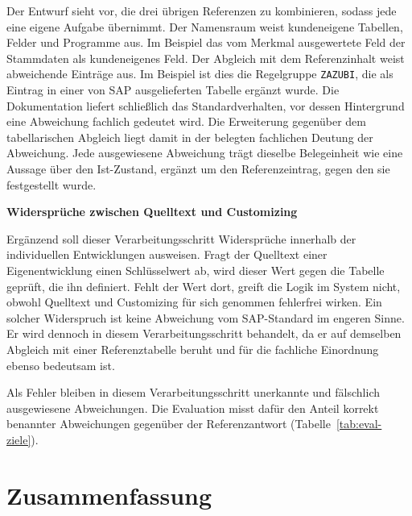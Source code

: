 Der Entwurf sieht vor, die drei übrigen Referenzen zu kombinieren, sodass jede eine eigene Aufgabe übernimmt. Der Namensraum weist kundeneigene Tabellen, Felder und Programme aus. Im Beispiel das vom Merkmal ausgewertete Feld der Stammdaten als kundeneigenes Feld. Der Abgleich mit dem Referenzinhalt weist abweichende Einträge aus. Im Beispiel ist dies die Regelgruppe \texttt{ZAZUBI}, die als Eintrag in einer von SAP ausgelieferten Tabelle ergänzt wurde. Die Dokumentation liefert schließlich das Standardverhalten, vor dessen Hintergrund eine Abweichung fachlich gedeutet wird. Die Erweiterung gegenüber dem tabellarischen Abgleich liegt damit in der belegten fachlichen Deutung der Abweichung. Jede ausgewiesene Abweichung trägt dieselbe Belegeinheit wie eine Aussage über den Ist-Zustand, ergänzt um den Referenzeintrag, gegen den sie festgestellt wurde.

\textbf{Widersprüche zwischen Quelltext und Customizing}

Ergänzend soll dieser Verarbeitungsschritt Widersprüche innerhalb der individuellen Entwicklungen ausweisen. Fragt der Quelltext einer Eigenentwicklung einen Schlüsselwert ab, wird dieser Wert gegen die Tabelle geprüft, die ihn definiert. Fehlt der Wert dort, greift die Logik im System nicht, obwohl Quelltext und Customizing für sich genommen fehlerfrei wirken. Ein solcher Widerspruch ist keine Abweichung vom SAP-Standard im engeren Sinne. Er wird dennoch in diesem Verarbeitungsschritt behandelt, da er auf demselben Abgleich mit einer Referenztabelle beruht und für die fachliche Einordnung ebenso bedeutsam ist.

Als Fehler bleiben in diesem Verarbeitungsschritt unerkannte und fälschlich ausgewiesene Abweichungen. Die Evaluation misst dafür den Anteil korrekt benannter Abweichungen gegenüber der Referenzantwort (Tabelle~\ref{tab:eval-ziele}).


\section{Zusammenfassung}
\label{sec:ansatz-zusammenfassung}

